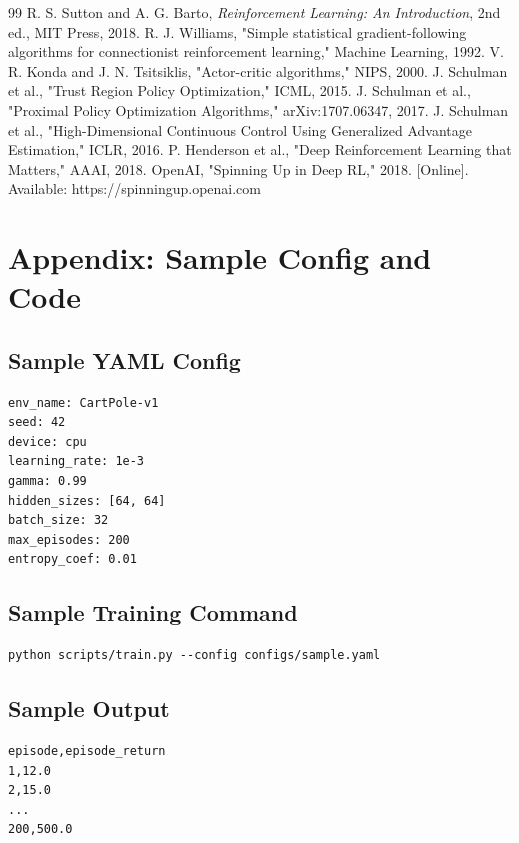 \documentclass[conference]{IEEEtran}
\begin{document}

\begin{thebibliography}{99}
 R. S. Sutton and A. G. Barto, \emph{Reinforcement Learning: An Introduction}, 2nd ed., MIT Press, 2018.
 R. J. Williams, "Simple statistical gradient-following algorithms for connectionist reinforcement learning," Machine Learning, 1992.
 V. R. Konda and J. N. Tsitsiklis, "Actor-critic algorithms," NIPS, 2000.
 J. Schulman et al., "Trust Region Policy Optimization," ICML, 2015.
 J. Schulman et al., "Proximal Policy Optimization Algorithms," arXiv:1707.06347, 2017.
 J. Schulman et al., "High-Dimensional Continuous Control Using Generalized Advantage Estimation," ICLR, 2016.
 P. Henderson et al., "Deep Reinforcement Learning that Matters," AAAI, 2018.
 OpenAI, "Spinning Up in Deep RL," 2018. [Online]. Available: https://spinningup.openai.com
\end{thebibliography}

\appendices
\section{Appendix: Sample Config and Code}
\subsection{Sample YAML Config}
\begin{verbatim}
env_name: CartPole-v1
seed: 42
device: cpu
learning_rate: 1e-3
gamma: 0.99
hidden_sizes: [64, 64]
batch_size: 32
max_episodes: 200
entropy_coef: 0.01
\end{verbatim}

\subsection{Sample Training Command}
\begin{verbatim}
python scripts/train.py --config configs/sample.yaml
\end{verbatim}

\subsection{Sample Output}
\begin{verbatim}
episode,episode_return
1,12.0
2,15.0
...
200,500.0
\end{verbatim}
\end{document}
